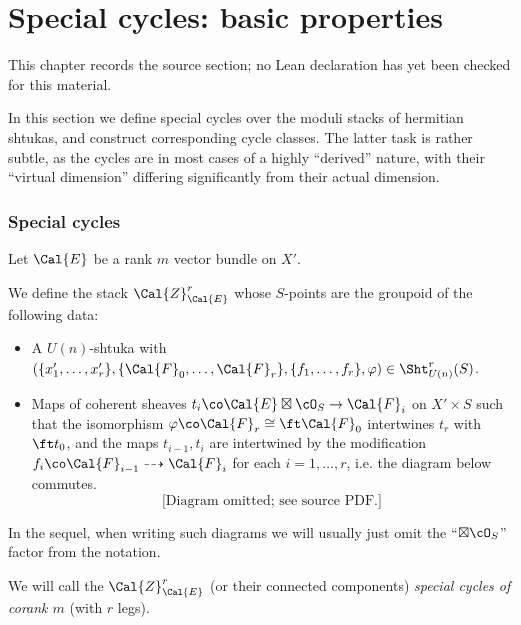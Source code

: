 \chapter{Special cycles: basic properties}
\label{higher-siegel-weil-unitary-nonsingular-terms-chapter-07}

\begin{remark}
\label{higher-siegel-weil-unitary-nonsingular-terms-chapter-07-source}
This chapter records the source section; no Lean declaration has yet been checked for this material.
\notready
\end{remark}

\label{s:int prob}

In this section we define special cycles over the moduli stacks of hermitian shtukas, and construct corresponding cycle classes. The latter task is rather subtle, as the cycles are in most cases of a highly ``derived'' nature, with their ``virtual dimension'' differing significantly from their actual dimension.

\subsection{Special cycles}

\begin{defn}
\notready\label{def: Z} Let $\Cal{E}$ be a rank $m$ vector bundle on $X'$.

 We define the stack $\Cal{Z}_{\Cal{E}}^{r}$ whose $S$-points are the groupoid of the following data:
 \begin{itemize}
 \item A $U(n)$-shtuka with $(\{x'_1, \ldots, x'_r\}, \{\Cal{F}_0, \ldots, \Cal{F}_r\}, \{f_1, \ldots, f_r\}, \varphi) \in  \Sht_{U(n)}^{r}(S)$.
 \item Maps of coherent sheaves  $t_i \co \Cal{E} \boxtimes \cO_{S} \rightarrow \Cal{F}_i$ on $X'\times S$ such that the isomorphism $\varphi \co \Cal{F}_r \cong \ft \Cal{F}_0$ intertwines $t_r$ with $\ft t_0$, and the maps $t_{i-1}, t_{i}$ are intertwined by the modification $f_i \co  \Cal{F}_{i-1} \dashrightarrow \Cal{F}_{i}$ for each $i = 1, \ldots, r$, i.e. the diagram below commutes.
\[
\text{[Diagram omitted; see source PDF.]}
\]
\end{itemize}
In the sequel, when writing such diagrams we will usually just omit the ``$\boxtimes \cO_S$'' factor from the notation.


We will call the $\Cal{Z}_{\Cal{E}}^r$ (or their connected components) {\em special cycles of corank $m$} (with $r$ legs).
\end{defn}


